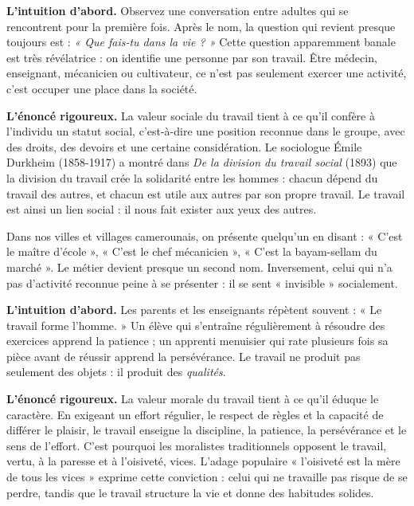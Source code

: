 \documentclass[11pt]{article}
\newcommand{\cle}[1]{{\popxbold\color{popdark}#1}}
\newcounter{popsec}
\newcounter{popsub}
\newcommand{\courssub}[1]{%
  \stepcounter{popsub}%
  \par\vspace{9pt}\noindent{\popxbold\fontsize{11.5}{13}\selectfont\color{popink}{\color{poporange}\thepopsec.\thepopsub}\hspace{6pt}#1}\par\nopagebreak\vspace{4pt}
}
\begin{document}
\textbf{L'intuition d'abord.} Observez une conversation entre adultes qui se rencontrent pour la première fois. Après le nom, la question qui revient presque toujours est : \emph{« Que fais-tu dans la vie ? »} Cette question apparemment banale est très révélatrice : on identifie une personne par son travail. Être médecin, enseignant, mécanicien ou cultivateur, ce n'est pas seulement exercer une activité, c'est occuper une \cle{place} dans la société.

\textbf{L'énoncé rigoureux.} La valeur sociale du travail tient à ce qu'il confère à l'individu un \cle{statut social}, c'est-à-dire une position reconnue dans le groupe, avec des droits, des devoirs et une certaine considération. Le sociologue Émile Durkheim (1858-1917) a montré dans \emph{De la division du travail social} (1893) que la division du travail crée la \cle{solidarité} entre les hommes : chacun dépend du travail des autres, et chacun est utile aux autres par son propre travail. Le travail est ainsi un lien social : il nous fait exister aux yeux des autres.

\begin{exemplebox}
Dans nos villes et villages camerounais, on présente quelqu'un en disant : « C'est le maître d'école », « C'est le chef mécanicien », « C'est la bayam-sellam du marché ». Le métier devient presque un second nom. Inversement, celui qui n'a pas d'activité reconnue peine à se présenter : il se sent « invisible » socialement.
\end{exemplebox}

\courssub{La valeur morale : le travail forme le caractère}

\textbf{L'intuition d'abord.} Les parents et les enseignants répètent souvent : « Le travail forme l'homme. » Un élève qui s'entraîne régulièrement à résoudre des exercices apprend la patience ; un apprenti menuisier qui rate plusieurs fois sa pièce avant de réussir apprend la persévérance. Le travail ne produit pas seulement des objets : il produit des \emph{qualités}.

\textbf{L'énoncé rigoureux.} La valeur morale du travail tient à ce qu'il éduque le caractère. En exigeant un effort régulier, le respect de règles et la capacité de différer le plaisir, le travail enseigne la \cle{discipline}, la \cle{patience}, la \cle{persévérance} et le sens de l'effort. C'est pourquoi les moralistes traditionnels opposent le travail, vertu, à la paresse et à l'oisiveté, vices. L'adage populaire « l'oisiveté est la mère de tous les vices » exprime cette conviction : celui qui ne travaille pas risque de se perdre, tandis que le travail structure la vie et donne des habitudes solides.
\end{document}
